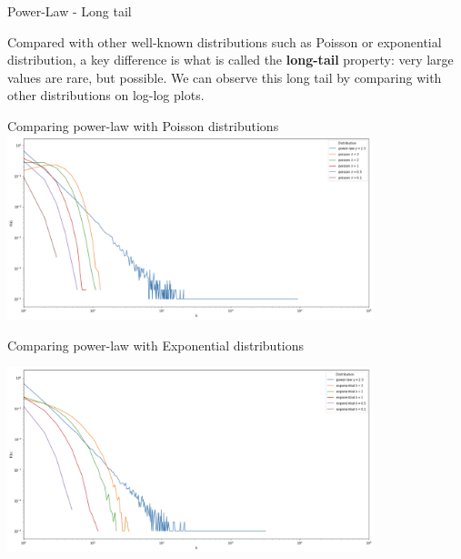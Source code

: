 \documentclass[a4paper,11pt]{book}
\begin{document}
\begin{textbox}{Power-Law - Long tail}

Compared with other well-known distributions such as Poisson or exponential distribution, a key difference is what is called the \textbf{long-tail} property: very large values are rare, but possible. We can observe this long tail by comparing with other distributions on log-log plots.

\begin{center}
Comparing power-law with Poisson distributions
\includegraphics[width=0.8\textwidth]{pics/SF-poisson.png}

Comparing power-law with Exponential distributions


\includegraphics[width=0.8\textwidth]{pics/SF-exponential.png}

\end{center}

\end{textbox}
\end{document}
